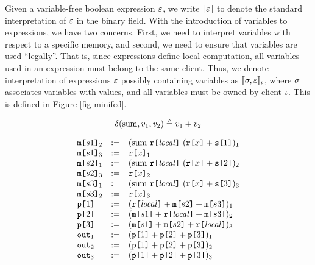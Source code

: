 Given a variable-free boolean expression $\varepsilon$, we write $\llbracket \varepsilon \rrbracket$
to denote the standard interpretation of $\varepsilon$ in the binary field.
With the introduction of variables to expressions, we have two
concerns. First, we need to interpret variables with respect to a
specific memory, and second, we need to ensure that variables are used
``legally''. That is, since expressions define local computation, all
variables used in an expression must belong to the same client.  Thus,
we denote interpretation of expressions $\varepsilon$ possibly containing
variables as $\llbracket \sigma,\varepsilon \rrbracket_{\iota}$, where $\sigma$ associates
variables with values, and all variables must be owned by client
$\iota$. This is defined in Figure \ref{fig-minifed}.


$$
\delta(\mathrm{sum},v_1,v_2) \triangleq v_1 + v_2
$$

$$
\begin{array}{lll}
  \texttt{m[}s1\texttt{]}_{2} &:=& (\mathrm{sum}\ \texttt{r[}\mathit{local}\texttt{]}\ (\texttt{r[}x\texttt{]} + \texttt{s[}1\texttt{]})_{1} \\ 
  \texttt{m[}s1\texttt{]}_{3} &:=& \texttt{r[}x\texttt{]}_{1} \\ 
  \texttt{m[}s2\texttt{]}_{1} &:=& (\mathrm{sum}\ \texttt{r[}\mathit{local}\texttt{]}\ (\texttt{r[}x\texttt{]} + \texttt{s[}2\texttt{]})_{2} \\ 
  \texttt{m[}s2\texttt{]}_{3} &:=& \texttt{r[}x\texttt{]}_{2} \\ 
  \texttt{m[}s3\texttt{]}_{1} &:=& (\mathrm{sum}\ \texttt{r[}\mathit{local}\texttt{]}\ (\texttt{r[}x\texttt{]} + \texttt{s[}3\texttt{]})_{3} \\ 
  \texttt{m[}s3\texttt{]}_{2} &:=& \texttt{r[}x\texttt{]}_{3} \\ 
  \texttt{p[}1\texttt{]} &:=& (\texttt{r[}\mathit{local}\texttt{]} + \texttt{m[}s2\texttt{]} + \texttt{m[}s3\texttt{]})_{1} \\ 
  \texttt{p[}2\texttt{]} &:=& (\texttt{m[}s1\texttt{]} + \texttt{r[}\mathit{local}\texttt{]} + \texttt{m[}s3\texttt{]})_{2} \\
  \texttt{p[}3\texttt{]} &:=& (\texttt{m[}s1\texttt{]} + \texttt{m[}s2\texttt{]} + \texttt{r[}\mathit{local}\texttt{]})_{3} \\ 
  \texttt{out}_{1} &:=& (\texttt{p[}1\texttt{]} + \texttt{p[}2\texttt{]} + \texttt{p[}3\texttt{]})_{1}\\
  \texttt{out}_{2} &:=& (\texttt{p[}1\texttt{]} + \texttt{p[}2\texttt{]} + \texttt{p[}3\texttt{]})_{2}\\
  \texttt{out}_{3} &:=& (\texttt{p[}1\texttt{]} + \texttt{p[}2\texttt{]} + \texttt{p[}3\texttt{]})_{3}
\end{array}
$$


